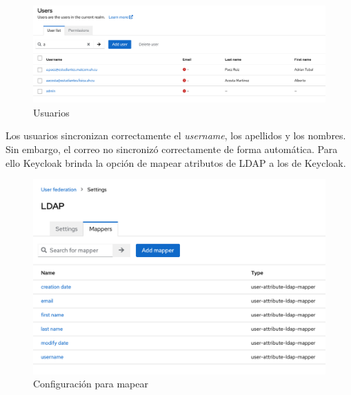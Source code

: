 \begin{enumerate}
	\begin{figure}[H]
		\centering
		\includegraphics[width=1\linewidth]{Graphics/users_not_mapped}
		\caption{Usuarios }
		\label{fig:usersnotmapped}
	\end{figure}
	
	Los usuarios sincronizan correctamente el \textit{username}, los apellidos y los nombres. Sin embargo, el correo no sincronizó correctamente de forma automática. Para ello Keycloak brinda la opción de mapear atributos de LDAP a los de Keycloak. 
	
	\begin{figure}[H]
		\centering
		\includegraphics[width=1\linewidth]{Graphics/mappers}
		\caption{Configuración para mapear }
		\label{fig:mapper}
	\end{figure}


\end{enumerate}
